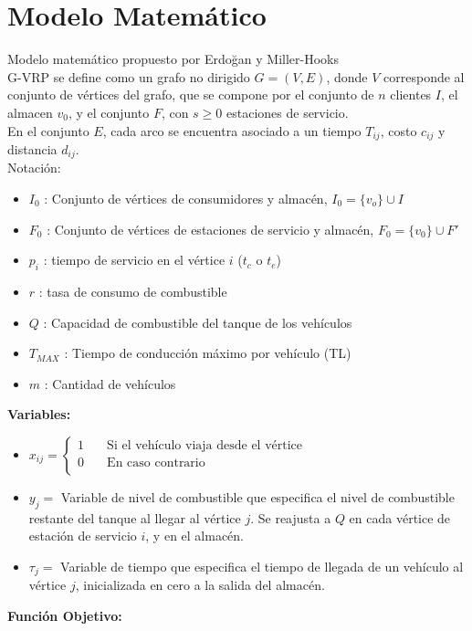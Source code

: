 \documentclass[letter, 10pt]{article}
\begin{document}
\section{Modelo Matem\'atico}
Modelo matemático propuesto por Erdoğan y Miller-Hooks~\cite{erdogan_green_2012}
\\ G-VRP se define como un grafo no dirigido $G=(V,E)$, donde $V$ corresponde al conjunto de vértices del grafo, que se compone por el conjunto de $n$ clientes $I$, el almacen $v_0$, y el conjunto $F$, con $s \geq 0$ estaciones de servicio.
\\En el conjunto $E$, cada arco se encuentra asociado a un tiempo $T_{ij}$, costo $c_{ij}$ y distancia $d_{ij}$.
\\Notación:
\begin{itemize}
    \item $I_0$ : Conjunto de vértices de consumidores y almacén, $I_0 = \{v_o\} \cup I$
    \item $F_0$ : Conjunto de vértices de estaciones de servicio y almacén, $F_0 = \{v_0\} \cup F'$
    \item $p_i$ : tiempo de servicio en el vértice $i$ ($t_c$ o $t_e$)
    \item $r$ : tasa de consumo de combustible
    \item $Q$ : Capacidad de combustible del tanque de los vehículos
    \item $T_{MAX}$ : Tiempo de conducción máximo por vehículo (TL)
    \item $m$ : Cantidad de vehículos
\end{itemize}
\textbf{Variables:}
\begin{itemize}
    \item $x_{ij}= \begin{cases} 
     \text{1} &\quad\text{Si el vehículo viaja desde el vértice}\\
       \text{0} &\quad\text{En caso contrario}\\
       \end{cases}$
    \item $y_j = $ Variable de nivel de combustible que especifica el nivel de combustible restante del tanque al llegar al vértice $j$. Se reajusta a $Q$ en cada vértice de estación de servicio $i$, y en el almacén.
    \item $\tau_j = $ Variable de tiempo que especifica el tiempo de llegada de un vehículo al vértice $j$, inicializada en cero a la salida del almacén.
\end{itemize}
\textbf{Función Objetivo:}
\end{document}
